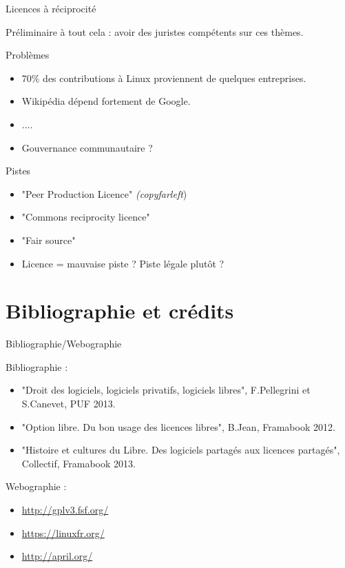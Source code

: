 \documentclass{beamer}
\begin{document}
\begin{frame}{Licences à réciprocité}

Préliminaire à tout cela : avoir des juristes compétents sur ces thèmes.

  \begin{block}{Problèmes}
    \begin{itemize}
    \item 70\% des contributions à Linux proviennent de quelques entreprises. 
    \item Wikipédia dépend fortement de Google.
    \item ....
    \item Gouvernance communautaire ? 
    \end{itemize}
  \end{block}

  \begin{block}{Pistes}
    \begin{itemize}
    \item "Peer Production Licence" \textit{(copyfarleft})
    \item "Commons reciprocity licence"
    \item "Fair source"
    \item Licence = mauvaise piste ? Piste légale plutôt ?
    \end{itemize}
    
  \end{block}
  
\end{frame}

\section{Bibliographie et crédits}

\begin{frame}{Bibliographie/Webographie}

Bibliographie :

  \begin{itemize}
  \item "Droit des logiciels, logiciels privatifs, logiciels libres", F.Pellegrini et S.Canevet, PUF 2013.
  \item "Option libre. Du bon usage des licences libres", B.Jean, Framabook 2012.
  \item "Histoire et cultures du Libre. Des logiciels partagés aux licences partagés", Collectif, Framabook 2013.
  \end{itemize}

Webographie :

\begin{itemize}
\item \url{http://gplv3.fsf.org/}
\item \url{https://linuxfr.org/}
\item \url{http://april.org/}
\end{itemize}
  
\end{frame}
\end{document}
